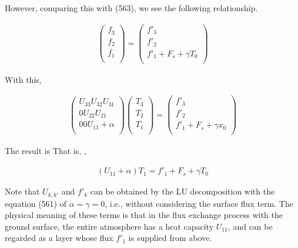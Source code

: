 However, comparing this with (563), we see the following relationship.

\begin{eqnarray}
  \left( \begin{array}{l}
         f_3 \\ f_2 \\ f_1 \\
         \end{array} \right)
 =
  \left( \begin{array}{l}
         f'_3 \\ f'_2 \\ f'_1 + F_s + \gamma T_0 \\
         \end{array} \right)
\end{eqnarray}

With this,

\begin{eqnarray}
  \left( \begin{array}{lll}
         U_{33}  U_{32}  U_{31} \\
         0       U_{22}  U_{21} \\
         0       0       U_{11} + \alpha \\
         \end{array} \right)
  \left( \begin{array}{l}
         T_3 \\ T_2 \\ T_1 \\
         \end{array} \right)
  =
  \left(  \begin{array}{l}
          f'_3 \\ f'_2 \\ f'_1 + F_s + \gamma x_0 \\
          \end{array} \right)
\end{eqnarray}

The result is That is, ,

\begin{eqnarray}
  ( U_{11} +  \alpha  ) T_1 = f'_1 + F_s + \gamma T_0
\end{eqnarray}

Note that \(U_{k,k'}\) and \(f'_k\) can be obtained by the LU decomposition with the equation (561) of \(\alpha=\gamma=0\), i.e., without considering the surface flux term. The physical meaning of
these terms is that in the flux exchange process with the ground surface, the entire atmosphere has a heat capacity \(U_{11}\), and can be regarded as a layer whose flux \(f'_1\) is supplied from
above.

